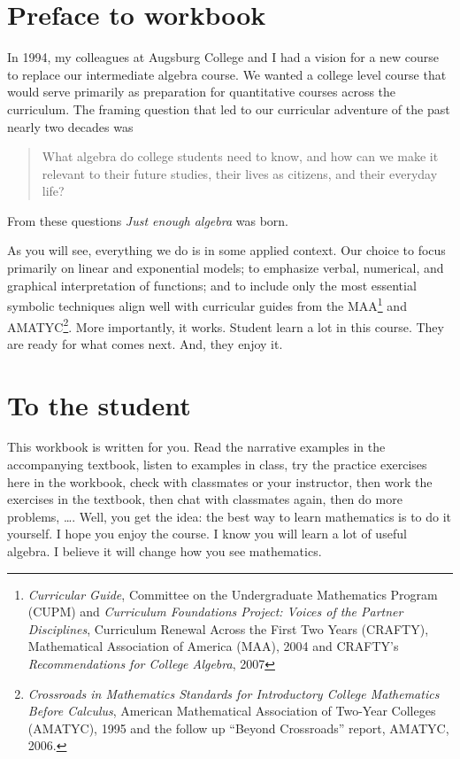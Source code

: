 
\section*{Preface to workbook}

In 1994, my colleagues at Augsburg College and I had a vision for a new course to replace our intermediate algebra course.  We wanted a college level course that would serve primarily as preparation for quantitative courses across the curriculum. The framing question that led to our curricular adventure of the past nearly two decades was 
\begin{quote}  What algebra do college students need to know, and how can we make it relevant to their future studies, their lives as citizens, and their everyday life?
\end{quote}
From these questions \emph{Just enough algebra} was born.  

As you will see, everything we do is in some applied context.  
Our choice to focus primarily on linear and exponential models; to emphasize verbal, numerical, and graphical interpretation of functions; and to include only the most essential symbolic techniques  align well with curricular guides from the MAA\footnote{\emph{Curricular Guide}, Committee on the Undergraduate Mathematics Program (CUPM) and \emph{Curriculum Foundations Project:  Voices of the Partner Disciplines}, Curriculum Renewal Across the First Two Years (CRAFTY), Mathematical Association of America (MAA), 2004 and CRAFTY's \emph{Recommendations for College Algebra}, 2007} 
and AMATYC\footnote{\emph{Crossroads in Mathematics Standards for Introductory College Mathematics Before Calculus}, American Mathematical Association of Two-Year Colleges (AMATYC), 1995 and the follow up ``Beyond Crossroads'' report, AMATYC, 2006.}.
More importantly, it works.  Student learn a lot in this course.  They are ready for what comes next.  And, they enjoy it.


\section*{To the student}
This workbook is written for you.  Read the narrative examples in the accompanying textbook, listen to examples in class, try the practice exercises here in the workbook, check with classmates or your instructor, then work the exercises in the textbook, then chat with classmates again, then do more problems, \ldots.  Well, you get the idea:  the best way to learn mathematics is to do it yourself.  I hope you enjoy the course.  I know you will learn a lot of useful algebra.  I believe it will change how you see mathematics.

